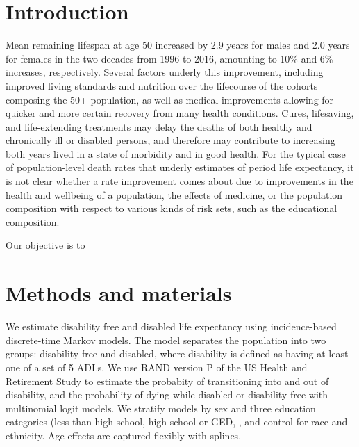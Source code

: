\section{Introduction}
Mean remaining lifespan at age 50 increased by 2.9 years for males and 2.0 years for females in the two decades from 1996 to 2016, amounting to 10\% and 6\% increases, respectively. Several factors underly this improvement, including improved living standards and nutrition over the lifecourse of the cohorts composing the 50+ population, as well as medical improvements allowing for quicker and more certain recovery from many health conditions. Cures, lifesaving, and life-extending treatments may delay the deaths of both healthy and chronically ill or disabled persons, and therefore may contribute to increasing both years lived in a state of morbidity and in good health. For the typical case of population-level death rates that underly estimates of period life expectancy, it is not clear whether a rate improvement comes about due to improvements in the health and wellbeing of a population, the effects of medicine, or the population composition with respect to various kinds of risk sets, such as the educational composition. 

Our objective is to 

\section{Methods and materials}
We estimate disability free and disabled life expectancy using incidence-based discrete-time Markov models. The model separates the population into two groups: disability free and disabled, where disability is defined as having at least one of a set of 5 ADLs. We use RAND version P of the US Health and Retirement Study \citep{RAND, HRS} to estimate the probabity of transitioning into and out of disability, and the probability of dying while disabled or disability free with multinomial logit models. We stratify models by sex and three education categories (less than high school, high school or GED, , and control for race and ethnicity. Age-effects are captured flexibly with splines.


